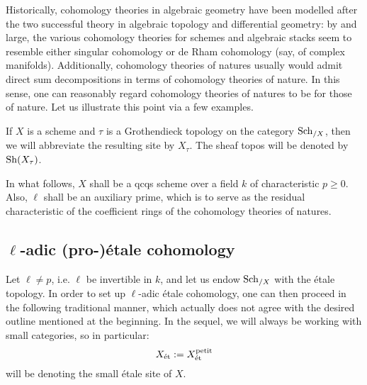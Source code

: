             Historically, cohomology theories in algebraic geometry have been modelled after the two successful theory in algebraic topology and differential geometry: by and large, the various cohomology theories for schemes and algebraic stacks seem to resemble either singular cohomology or de Rham cohomology (say, of complex manifolds). Additionally, cohomology theories of  natures usually would admit direct sum decompositions in terms of cohomology theories of  nature. In this sense, one can reasonably regard cohomology theories of  natures to be  for those of  nature. Let us illustrate this point via a few examples.
    
            \begin{convention}
                If $X$ is a scheme and $\tau$ is a Grothendieck topology on the category $\mathrm{Sch}_{/X}$, then we will abbreviate the resulting site by $X_{\tau}$. The sheaf topos will be denoted by $\mathrm{Sh}(X_{\tau})$.
            \end{convention}
            \begin{convention}
                In what follows, $X$ shall be a qcqs scheme over a field $k$ of characteristic $p \geq 0$. Also, $\ell$ shall be an auxiliary prime, which is to serve as the residual characteristic of the coefficient rings of the cohomology theories of  natures.
            \end{convention}
    
        \subsection{\texorpdfstring{$\ell$}{}-adic (pro-)\'etale cohomology}
            Let $\ell \not = p$, i.e. $\ell$ be invertible in $k$, and let us endow $\mathrm{Sch}_{/X}$ with the \'etale topology. In order to set up $\ell$-adic \'etale cohomology, one can then proceed in the following traditional manner, which actually does not agree with the desired outline mentioned at the beginning. In the sequel, we will always be working with small categories, so in particular:
                $$X_{\mathrm{\acute{e}t}} := X_{\mathrm{\acute{e}t}}^{\mathrm{petit}}$$
            will be denoting the small \'etale site of $X$. 

